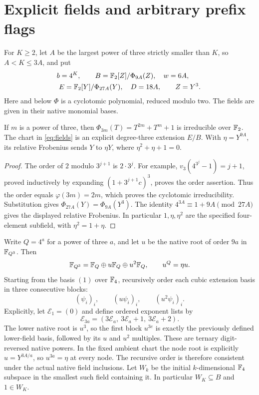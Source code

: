 \section{Explicit fields and arbitrary prefix flags}\label{sec:fields}

For $K\geq2$, let $A$ be the largest power of three strictly smaller
than $K$, so $A<K\leq3A$, and put
\begin{equation}\label{eq:fields}
 \begin{gathered}
 b=4^K,\qquad
 B=\mathbb F_2[Z]/\Phi_{9A}(Z),\quad w=6A,\qquad
 \\
 E=\mathbb F_2[Y]/\Phi_{27A}(Y),\quad D=18A,
 \qquad Z=Y^3.
 \end{gathered}
\end{equation}
Here and below $\Phi$ is a cyclotomic polynomial, reduced modulo two.
The fields are given in their native monomial bases.

\begin{lemma}\label{lem:fields}
If $m$ is a power of three, then
$\Phi_{3m}(T)=T^{2m}+T^m+1$ is irreducible over $\mathbb F_2$.
The chart in \eqref{eq:fields} is an explicit degree-three extension
$E/B$. With $\eta=Y^{9A}$, its relative Frobenius sends
$Y$ to $\eta Y$, where $\eta^2+\eta+1=0$.
\end{lemma}
\begin{proof}
The order of $2$ modulo $3^{j+1}$ is $2\cdot3^j$.
For example, $v_3(4^{3^j}-1)=j+1$, proved inductively by expanding
$(1+3^{j+1}c)^3$, proves the order assertion. Thus the order equals
$\varphi(3m)=2m$, which proves the cyclotomic irreducibility.
Substitution gives $\Phi_{27A}(Y)=\Phi_{9A}(Y^3)$.
The identity $4^{3A}\equiv1+9A\pmod{27A}$ gives the displayed
relative Frobenius. In particular $1,\eta,\eta^2$ are the
specified four-element subfield, with $\eta^2=1+\eta$.
\end{proof}

Write $Q=4^a$ for a power of three $a$, and let $u$ be the native
root of order $9a$ in $\mathbb F_{Q^3}$. Then
\[
 \mathbb F_{Q^3}=\mathbb F_Q\oplus u\mathbb F_Q\oplus u^2\mathbb F_Q,
 \qquad u^Q=\eta u.
\]
Starting from the basis $(1)$ over $\mathbb F_4$, recursively order each
cubic extension basis in three consecutive blocks:
\[
 (\psi_i)_i,\qquad (u\psi_i)_i,\qquad (u^2\psi_i)_i.
\]
Explicitly, let $\mathcal E_1=(0)$ and define ordered exponent lists by
\[
 \mathcal E_{3a}=(3\mathcal E_a,\ 3\mathcal E_a+1,\ 3\mathcal E_a+2).
\]
The lower native root is $u^3$, so the first block $u^{3e}$ is
exactly the previously defined lower-field basis, followed by its
$u$ and $u^2$ multiples. These are ternary digit-reversed native
powers. In the fixed ambient chart the node root is explicitly
$u=Y^{3A/a}$, so $u^{3a}=\eta$ at every node. The recursive order
is therefore consistent under the actual native field inclusions.
Let $W_k$ be
the initial $k$-dimensional $\mathbb F_4$ subspace in the smallest such field
containing it. In particular $W_K\subseteq B$ and $1\in W_K$.

